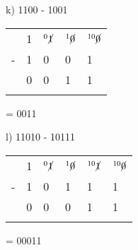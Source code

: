 \begin{figure}[H]
    \begin{minipage}[t]{0.45\textwidth}
        k) 1100 - 1001
        \begin{table}[H]
            \centering
            \begin{tabularx}{0.6\linewidth}{rXXXX}
                & 1 & $^0\cancel{1}$ & $^{1}\cancel{0}$ & $^{10}\cancel{0}$ \\
                - & 1 & 0 & 0 & 1 \\
                \cline{2-5}
                & 0 & 0 & 1 & 1 \\
                \cline{2-5}
                &  & &  & 
            \end{tabularx}
        \end{table}
        = 0011
    \end{minipage}\hfill
    \begin{minipage}[t]{0.45\textwidth}
        l) 11010 - 10111
        \begin{table}[H]
            \centering
            \begin{tabularx}{0.7\linewidth}{rXXXXX}
                & 1 & $^0\cancel{1}$ & $^1\cancel{0}$ & $^{10}\cancel{1}$ & $^{10}\cancel{0}$ \\
                -& 1 & 0 & 1 & 1 & 1 \\
                \cline{2-6}
                & 0 & 0 & 0 & 1 & 1 \\
                \cline{2-6}
                &  &  &  & &
            \end{tabularx}
        \end{table}
        = 00011
    \end{minipage}\hfill
\end{figure}

